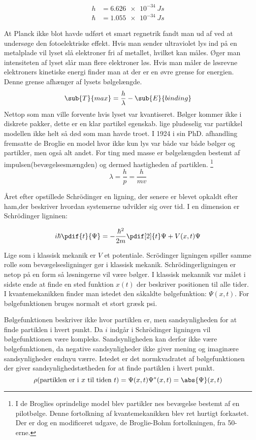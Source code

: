 \begin{align*}
h &= \SI{6.626e-34}{Js}\\
\hbar &= \SI{1.055e-34}{Js}
\end{align*}

At Planck ikke blot havde udført et smart regnetrik fandt man ud af ved at undersøge den fotoelektriske effekt. Hvis man sender ultraviolet lys ind på en metalplade vil lyset slå elektroner fri af metallet, hvilket kan måles. Øger man intensiteten af lyset slår man flere elektroner løs. Hvis man måler de løsrevne elektroners kinetiske energi finder man at der er en øvre grense for energien. Denne grense afhænger af lysets bølgelængde.
$$
\sub{T}{max} = \frac{h}{\lambda}-\sub{E}{binding}
$$
Nettop som man ville forvente hvis lyset var kvantiseret. Bølger kommer ikke i diskrete pakker, dette er en klar partikel egenskab.
lige pludeselig var partikkel modellen ikke helt så død som man havde troet. I 1924 i sin PhD. afhandling fremsatte de Broglie en model hvor ikke kun lys var både var både bølger og partikler, men også alt andet. For ting med masse er bølgelængden bestemt af impulsen(bevægelsesmængden) og dermed hastigheden af partiklen.
\footnote{I de Broglies oprindelige model blev partikler nes bevægelse bestemt af en pilotbølge. Denne fortolkning af kvantemekanikken blev ret hurtigt forkastet. Der er dog en modificeret udgave, de Broglie-Bohm fortolkningen, fra 50-erne.}
\begin{equation}
\lambda = \frac{h}{p} = \frac{h}{mv}
\end{equation}

Året efter opstillede Schrödinger en ligning, der senere er blevet opkaldt efter ham,der beskriver hvordan systemerne udvikler sig over tid. I en dimension er Schrödinger ligninen:

\begin{equation}
i\hbar\pdif{t}{\Psi}=-\frac{\hbar^2}{2m}\pdif[2]{t}\Psi+V(x,t)\Psi
\end{equation}

Lige som i klassisk mekanik er $V$ et potentiale.
Scrödinger ligningen spiller samme rolle som bevægelsesligninger gør i klassisk mekanik. Schrödingerligningen er netop på en form så løsningerne vil være bølger. I klassisk mekannik var målet i sidste ende at finde en sted funktion $x(t)$ der beskriver positionen til alle tider. I kvantemekanikken finder man istedet den såkaldte bølgefunktion: $\Psi(x,t)$. For bølgefunktionen  bruges normalt et stort græsk psi.

Bølgefunktionen beskriver ikke hvor partiklen er, men sandsynligheden for at finde partiklen i hvert punkt. Da $i$ indgår i Schrödinger ligningen vil bølgefunktionen være kompleks. Sandsynligheden kan derfor ikke være bølgefunktionen, da negative sandsynligheder ikke giver mening og imaginære sandsynligheder endnyu værre.
Istedet er det normkvadratet af bølgefunktionen der giver sandsynlighedstætheden for at finde partiklen i hvert punkt.
\begin{equation}
\rho(\text{partiklen er i }x\text{ til tiden }t)= \Psi(x,t)\Psi^*(x,t) = \abs{\Psi}(x,t)
\end{equation}

